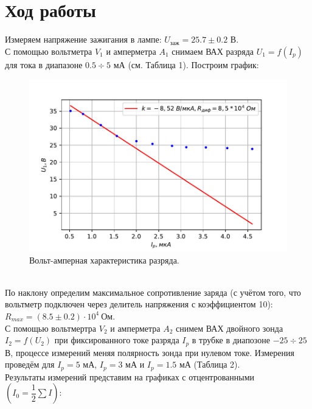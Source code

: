\documentclass[a4paper,12pt]{article}
\begin{document}
\section*{Ход работы}
Измеряем напряжение зажигания в лампе: $U_{\text{заж}} = 25.7\pm 0.2$ В.\\
С помощью вольтметра $V_1$ и амперметра $A_1$ снимаем ВАХ разряда $U_1=f(I_p)$ для тока в диапазоне $0.5 \div 5$ мА (см. Таблица 1).
Построим график:\\
\begin{figure}[h]
\centering
\includegraphics[scale=1.0]{uk.pdf}
\caption{Вольт-амперная характеристика разряда.}
\end{figure}\\
По наклону определим максимальное сопротивление заряда (с учётом того, что вольтметр подключен через делитель напряжения с коэффициентом 10): $R_{max} = (8.5\pm 0.2)\cdot 10^4~\text{Ом}$.\\
С помощью вольтмертра $V_2$ и амперметра $A_2$ снимем ВАХ двойного зонда $I_2 = f(U_2)$ при фиксированного токе разряда $I_p$ в трубке в диапозоне $-25 \div 25$ В, процессе измерений меняя полярность зонда при нулевом токе. Измерения проведём для $I_p = 5$ мА, $I_p = 3$ мА  и $I_p = 1.5$ мА (Таблица 2).\\
Результаты измерений представим на графиках с отцентрованными $\left(I_0 = \dfrac{1}{2}\sum I\right)$:
\newpage
\end{document}
